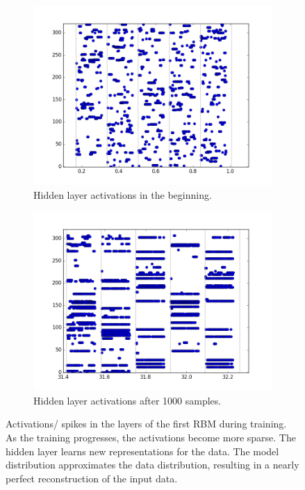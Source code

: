 \begin{figure}[h!]
	\begin{subfigure}[t]{.45\textwidth}
  		\centering
  		\includegraphics[width=.9\linewidth]{imgs/7x7/00006_h.png}
  		\caption{Hidden layer activations in the beginning.}
  		\label{fig:sub2}
	\end{subfigure}
	\begin{subfigure}[t]{.45\textwidth}
  		\centering
  		\includegraphics[width=.9\linewidth]{imgs/7x7/01992_h.png}
  		\caption{Hidden layer  activations after 1000 samples.}
  		\label{fig:sub2}
	\end{subfigure}
	\caption{Activations/ spikes in the layers of the first RBM during training. As the training progresses, the activations become more sparse. The hidden layer learns new representations for the data. The model distribution approximates the data distribution, resulting in a nearly perfect reconstruction of the input data.}
	\label{fig:stripesspl1}
\end{figure}



